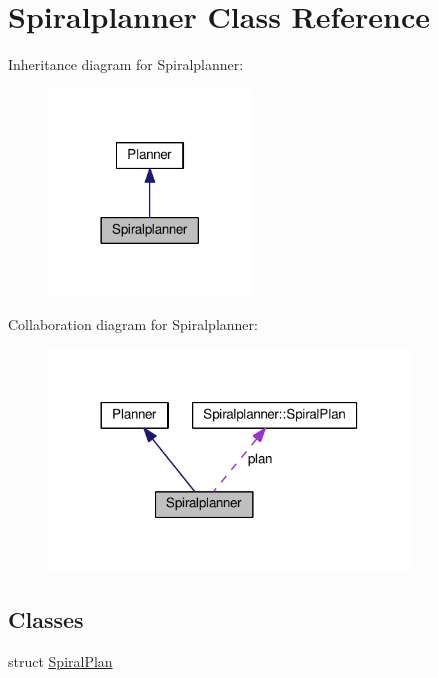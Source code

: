 \hypertarget{classSpiralplanner}{}\section{Spiralplanner Class Reference}
\label{classSpiralplanner}


Inheritance diagram for Spiralplanner\+:\nopagebreak
\begin{figure}[H]
\begin{center}
\leavevmode
\includegraphics[width=153pt]{d2/de4/classSpiralplanner__inherit__graph}
\end{center}
\end{figure}


Collaboration diagram for Spiralplanner\+:\nopagebreak
\begin{figure}[H]
\begin{center}
\leavevmode
\includegraphics[width=272pt]{d8/dd9/classSpiralplanner__coll__graph}
\end{center}
\end{figure}
\subsection*{Classes}
\begin{DoxyCompactItemize}
\item 
struct \hyperlink{structSpiralplanner_1_1SpiralPlan}{Spiral\+Plan}
\end{DoxyCompactItemize}
